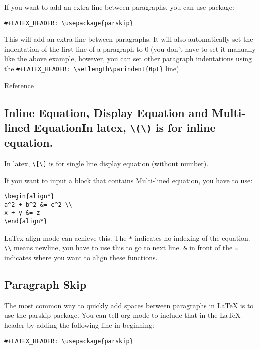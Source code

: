 \documentclass[11pt]{article}
\begin{document}
If you want to add an extra line between paragraphs, you can use package:
\begin{Verbatim}[frame=single]
#+LATEX_HEADER: \usepackage{parskip}
\end{Verbatim}
This will add an extra line between paragraphs. It will also automatically set the indentation of the first line of a paragraph to 0 (you don't have to set it manually like the above example, however, you can set other paragraph indentations using the \texttt{\#+LATEX\_HEADER: \textbackslash{}setlength\textbackslash{}parindent\{0pt\}} line).

\href{https://emacs.stackexchange.com/questions/16889/how-to-control-newline-and-indent-when-export-to-latex-from-org-mode-file}{Reference}
\subsection{Inline Equation, Display Equation and Multi-lined EquationIn latex, \texttt{\textbackslash{}(\textbackslash{})} is for inline equation.}
\label{sec:orge8e8f5a}

In latex, \texttt{\textbackslash{}[\textbackslash{}]} is for single line display equation (without number).

If you want to input a block that contains Multi-lined equation, you have to use:
\begin{Verbatim}[frame=single]
\begin{align*}
a^2 + b^2 &= c^2 \\
x + y &= z
\end{align*}
\end{Verbatim}

LaTex align mode can achieve this. The \texttt{*} indicates no indexing of the equation. \texttt{\textbackslash{}\textbackslash{}} means newline, you have to use this to go to next line. \texttt{\&} in front of the \texttt{=} indicates where you want to align these functions.
\subsection{Paragraph Skip}
\label{sec:org9c80593}
The most common way to quickly add spaces between paragraphs in \LaTeX{} is to use the parskip package. You can tell org-mode to include that in the \LaTeX{} header by adding the following line in beginning:
\begin{Verbatim}[frame=single]
#+LATEX_HEADER: \usepackage{parskip}
\end{Verbatim}
\end{document}
